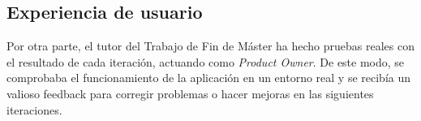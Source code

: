 \subsection{Experiencia de usuario}
\label{subsec:2.1.3}

Por otra parte, el tutor del Trabajo de Fin de Máster ha hecho pruebas reales con el resultado de cada iteración, actuando como {\it Product Owner}. De este modo, se comprobaba el funcionamiento de la aplicación en un entorno real y se recibía un valioso feedback para corregir problemas o hacer mejoras en las siguientes iteraciones.
